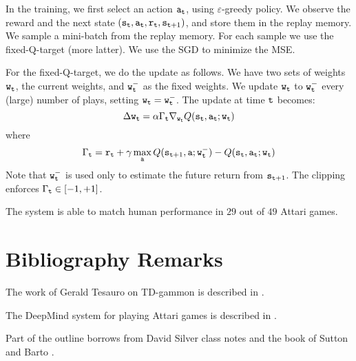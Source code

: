 In the training, we first select an action ${\tt a}_{\tt t}$, using
$\varepsilon$-greedy policy. We observe the reward and the next
state
$({\tt s}_{\tt t},{\tt a}_{\tt t},{\tt r}_{\tt t},{\tt s}_{{\tt t}+1})$,
and store them in the replay memory. We sample a mini-batch from the
replay memory. For each sample we use the fixed-Q-target (more
latter). We use the SGD to minimize the MSE.

For the fixed-Q-target, we do the update as follows. We have two
sets of weights ${\tt w}_{\tt t}$, the current weights, and
${\tt w}^-_{\tt t}$ as the fixed weights. We update ${\tt w}_{\tt t}$
to ${\tt w}^-_{\tt t}$ every (large) number of plays, setting
${\tt w}_{\tt t}={\tt w}^-_{\tt t}$. The update at time ${\tt t}$
becomes:
\[
\Delta {\tt w}_{\tt t} = \alpha \Gamma_{\tt t} \nabla_{{\tt w}_{\tt t}}
Q({\tt s}_{\tt t},{\tt a}_{\tt t};{\tt w}_{\tt t})
\]
where
\[
\Gamma_{{\tt t}}={\tt r}_{\tt t}+\gamma \max_{\tt a}
Q({\tt s}_{{\tt t}+1},{\tt a};{\tt w}^-_{\tt t})-Q({\tt s}_{\tt t},{\tt a}_{\tt t};{\tt w}_{\tt t})
\]
Note that ${\tt w}^-_{\tt t}$ is used only to estimate the future
return from ${\tt s}_{{\tt t}+1}$. The clipping enforces
$\Gamma_{\tt t}\in[-1,+1]$.

The system is able to match human performance in $29$ out of $49$
Attari games.







\section{Bibliography Remarks}

The work of Gerald Tesauro on TD-gammon is described in
\cite{Tesauro95,Tesauro02}.

The DeepMind system for playing Attari games is described in
\cite{MnihKSRVBGRFOPB15}.


Part of the outline borrows from David Silver class notes and
the book of Sutton and Barto \cite{SuttonB98}.
